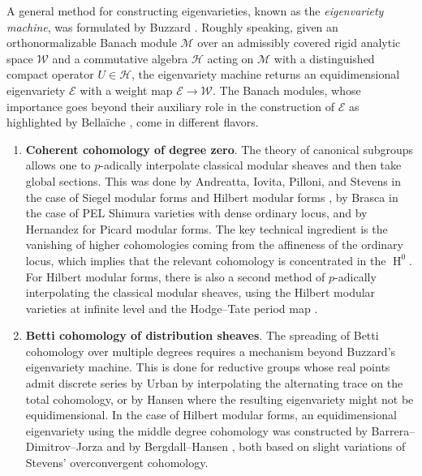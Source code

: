 \documentclass[11pt]{amsart}
\theoremstyle{definition} %
\theoremstyle{plain} %
\theoremstyle{remark} %
\newcommand{\cE}{{\mathcal E}}
\newcommand{\cH}{{\mathcal H}}
\newcommand{\cM}{{\mathcal M}}
\newcommand{\cW}{{\mathcal W}}
\DeclareMathOperator\rH{H}
\begin{document}
A general method for constructing eigenvarieties, known as the \emph{eigenvariety machine}, was formulated by Buzzard \cite{Buz07}.
Roughly speaking, given an orthonormalizable Banach module $\cM$ over an admissibly covered rigid analytic space $\cW$ and a commutative algebra $\cH$ acting on $\cM$ with a distinguished compact operator $U\in \cH$,  the eigenvariety machine returns an equidimensional eigenvariety $\cE$ with a weight map $\cE\rightarrow \cW$.
The Banach modules, whose importance goes beyond their auxiliary role in the construction of $\cE$ as highlighted by Bella\"{i}che \cite{bellaiche-TJM},  come in  different flavors. 
\begin{enumerate}
 \item {\bf Coherent cohomology of degree zero}.   The theory of canonical subgroups allows one to $p$-adically interpolate classical modular sheaves and then take global sections. This was done by Andreatta, Iovita, Pilloni, and Stevens in the case of Siegel modular forms \cite{AIP_Siegel} and Hilbert modular forms \cite{AIP16,AIS}, by Brasca \cite{Brasca} in the case of PEL Shimura varieties with dense ordinary locus, and by Hernandez \cite{Hernandez} for Picard modular forms. The key technical ingredient is the vanishing of higher cohomologies coming from the affineness of the ordinary locus, which implies that the relevant cohomology is concentrated in the $\rH^0$. 
 For Hilbert modular forms, there is also a second method of $p$-adically interpolating the classical modular sheaves, using the Hilbert modular varieties at infinite level and the Hodge--Tate period map \cite{BHW}. 
 \item {\bf Betti cohomology of distribution sheaves}.  The spreading of Betti cohomology over multiple degrees 
 requires a mechanism beyond Buzzard's eigenvariety machine. This is done for reductive groups whose real points admit discrete series by Urban \cite{Urb} by interpolating the alternating trace on the total cohomology, or by 
 Hansen \cite{Hansen} where the resulting eigenvariety might not be equidimensional. 
 In the case of Hilbert modular forms, an equidimensional eigenvariety using the middle degree cohomology was constructed  by Barrera--Dimitrov--Jorza \cite{BDJ} and by Bergdall--Hansen \cite{BH_Hilb}, 
 both  based on slight variations of Stevens' overconvergent cohomology.  
\end{enumerate}
\end{document}
